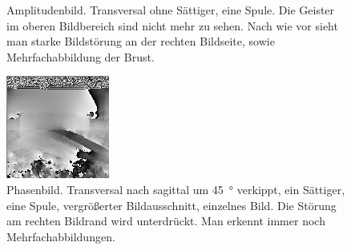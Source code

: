 \documentclass[
    11pt,
    ngerman
]{scrbook}
\begin{document}
\begin{figure}[htbp]
\begin{minipage}[htbp]{.45\textwidth}
    \caption{%
        Amplitudenbild. Transversal ohne Sättiger, eine Spule. Die Geister im oberen Bildbereich sind nicht mehr zu sehen. Nach wie vor sieht man starke Bildstörung an der rechten Bildseite, sowie Mehrfachabbildung der Brust.
    }
        \label{fig:2015-03-13_4_1}
    \end{minipage}
\end{figure}

\begin{figure}[htbp]
    \begin{minipage}[htbp]{.45\textwidth}
        \centering
        \includegraphics[width=.9\textwidth]{Abbildungen/2015-03-13_27_1.png}
        \caption{Phasenbild. Transversal nach sagittal um \SI{45}{\degree} verkippt, ein Sättiger, eine Spule, vergrößerter Bildausschnitt, einzelnes Bild. Die Störung am rechten Bildrand wird unterdrückt. Man erkennt immer noch Mehrfachabbildungen.}
        \label{fig:2015-03-13_27_1}
    \end{minipage}
    \hfill
    \begin{minipage}[htbp]{.45\textwidth}
        \centering

\end{minipage}
\end{figure}
\end{document}
